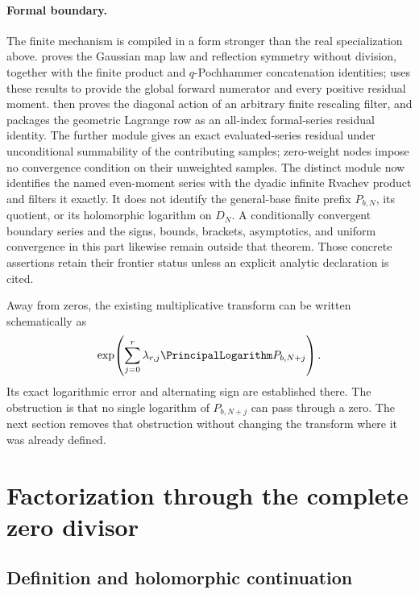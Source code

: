 \documentclass[11pt]{article}
\numberwithin{equation}{section}
\theoremstyle{definition}
\theoremstyle{remark}
\begin{document}
\paragraph{Formal boundary.}
The finite mechanism is compiled in a form stronger than the real
specialization above.   proves the Gaussian
map law and reflection symmetry without division, together with the finite
product and \(q\)-Pochhammer concatenation identities;
 uses these results to provide the
global forward numerator and every positive residual moment.
 then proves the diagonal action of an
arbitrary finite rescaling filter, and
 packages the geometric Lagrange row
as an all-index formal-series residual identity.  The further module
 gives an exact evaluated-series residual under
unconditional summability of the contributing samples; zero-weight nodes impose
no convergence condition on their unweighted samples.  The distinct module
 now identifies the named even-moment series
with the dyadic infinite Rvachev product and filters it exactly.  It does not
identify the general-base finite prefix \(P_{b,N}\), its quotient, or its
holomorphic logarithm on \(D_N\).  A conditionally convergent boundary series
and the signs, bounds, brackets, asymptotics, and uniform convergence in this
part likewise remain outside that theorem.  Those concrete assertions retain
their frontier status unless an explicit analytic declaration is cited.

Away from zeros, the existing multiplicative transform can be written schematically as
\[
 \exp\!\left(\sum_{j=0}^{r}\lambda_{r,j}\PrincipalLogarithm P_{b,N+j}\right).
\]
Its exact logarithmic error and alternating sign are established there.  The obstruction is
that no single logarithm of $P_{b,N+j}$ can pass through a zero.  The next section removes
that obstruction without changing the transform where it was already defined.

\section{Factorization through the complete zero divisor}\label{p3:sec:factorized}

\subsection{Definition and holomorphic continuation}
\end{document}
